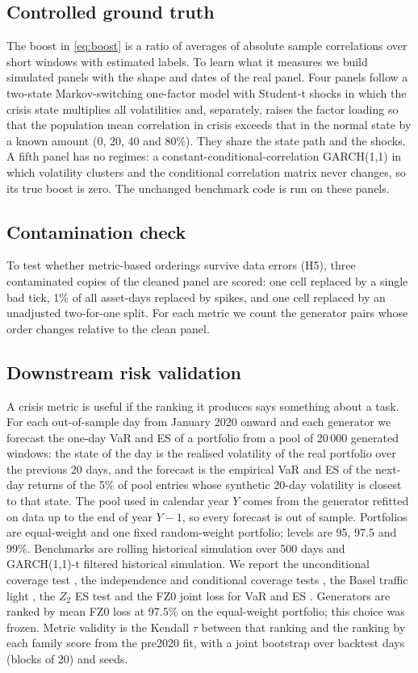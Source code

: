 \documentclass[journal]{IEEEtran}
\begin{document}
\subsection{Controlled ground truth}
The boost in \eqref{eq:boost} is a ratio of averages of absolute sample correlations over short windows with
estimated labels. To learn what it measures we build simulated panels with the shape and dates of the real
panel. Four panels follow a two-state Markov-switching one-factor model with Student-t shocks in which the
crisis state multiplies all volatilities and, separately, raises the factor loading so that the population
mean correlation in crisis exceeds that in the normal state by a known amount (0, 20, 40 and 80\%). They share
the state path and the shocks. A fifth panel has no regimes: a constant-conditional-correlation GARCH(1,1) in
which volatility clusters and the conditional correlation matrix never changes, so its true boost is zero. The
unchanged benchmark code is run on these panels.

\subsection{Contamination check}
To test whether metric-based orderings survive data errors (H5), three contaminated copies of the cleaned
panel are scored: one cell replaced by a single bad tick, 1\% of all asset-days replaced by spikes, and one
cell replaced by an unadjusted two-for-one split. For each metric we count the generator pairs whose order
changes relative to the clean panel.

\subsection{Downstream risk validation}
\label{sec:riskdesign}
A crisis metric is useful if the ranking it produces says something about a task. For each out-of-sample day
from January 2020 onward and each generator we forecast the one-day VaR and ES of a portfolio from a pool of
20\,000 generated windows: the state of the day is the realised volatility of the real portfolio over the
previous 20 days, and the forecast is the empirical VaR and ES of the next-day returns of the 5\% of pool
entries whose synthetic 20-day volatility is closest to that state. The pool used in calendar year $Y$ comes
from the generator refitted on data up to the end of year $Y-1$, so every forecast is out of sample. Portfolios
are equal-weight and one fixed random-weight portfolio; levels are 95, 97.5 and 99\%. Benchmarks are rolling
historical simulation over 500 days and GARCH(1,1)-t filtered historical simulation. We report the
unconditional coverage test \cite{kupiec1995techniques}, the independence and conditional coverage tests
\cite{christoffersen1998interval}, the Basel traffic light \cite{bcbs1996backtesting}, the $Z_2$ ES test
\cite{acerbi2014backtesting} and the FZ0 joint loss for VaR and ES
\cite{fissler2016elicitability,patton2019dynamic}. Generators are ranked by mean FZ0 loss at 97.5\% on the
equal-weight portfolio; this choice was frozen. Metric validity is the Kendall $\tau$ between that ranking and
the ranking by each family score from the pre2020 fit, with a joint bootstrap over backtest days (blocks of 20)
and seeds.
\end{document}
